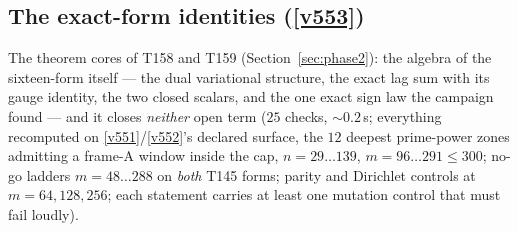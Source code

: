 \documentclass[11pt,a4paper]{article}
\begin{document}
\subsection{The exact-form identities (\texorpdfstring{\vref{v553}}{v553})}\label{sec:v553}
The theorem cores of T158 and T159 (Section~\ref{sec:phase2}): the algebra of the
sixteen-form itself --- the dual variational structure, the exact lag sum with its gauge
identity, the two closed scalars, and the one exact sign law the campaign found --- and it
closes \emph{neither} open term
 ($25$ checks, ${\sim}0.2$\,s; everything recomputed
on \vref{v551}/\vref{v552}'s declared surface, the $12$ deepest prime-power zones admitting
a frame-A window inside the cap, $n=29\ldots139$, $m=96\ldots291\le300$; no-go ladders
$m=48\ldots288$ on \emph{both} T145 forms; parity and Dirichlet controls at $m=64,128,256$;
each statement carries at least one mutation control that must fail loudly).
\end{document}
